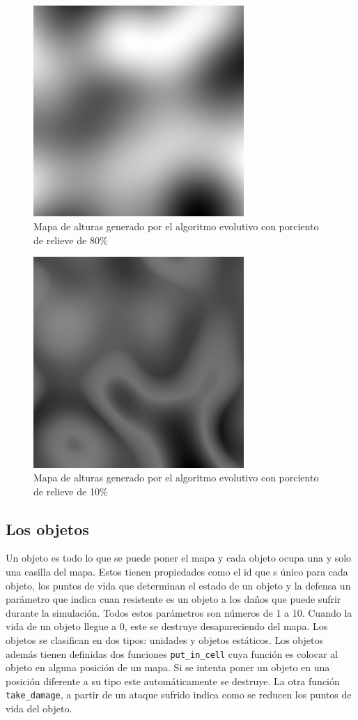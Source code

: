 \begin{figure}
	\centering
	\includegraphics[width=8cm]{chapters/img/map80.png}
	\caption{Mapa de alturas generado por el algoritmo evolutivo con porciento de relieve de 80\%}
\end{figure}

\begin{figure}
	\centering
	\includegraphics[width=8cm]{chapters/img/map10.png}
	\caption{Mapa de alturas generado por el algoritmo evolutivo con porciento de relieve de 10\%}
\end{figure}
\subsection{Los objetos}

Un objeto es todo lo que se puede poner el mapa y cada objeto ocupa una y solo una casilla del mapa. Estos tienen propiedades como el id que s único para cada objeto, los puntos de vida que determinan el estado de un objeto y la defensa un parámetro que indica cuan resistente es un objeto a los daños que puede sufrir durante la simulación. Todos estos parámetros son números de 1 a 10. Cuando la vida de un objeto llegue a 0, este se destruye desapareciendo del mapa. Los objetos se clasifican en dos tipos: unidades y objetos estáticos. Los objetos además tienen definidas dos funciones \verb|put_in_cell| cuya función es colocar al objeto en alguna posición de un mapa. Si se intenta poner un objeto en una posición diferente a su tipo este automáticamente se destruye. La otra función \verb|take_damage|, a partir de un ataque sufrido indica como se reducen los puntos de vida del objeto.

